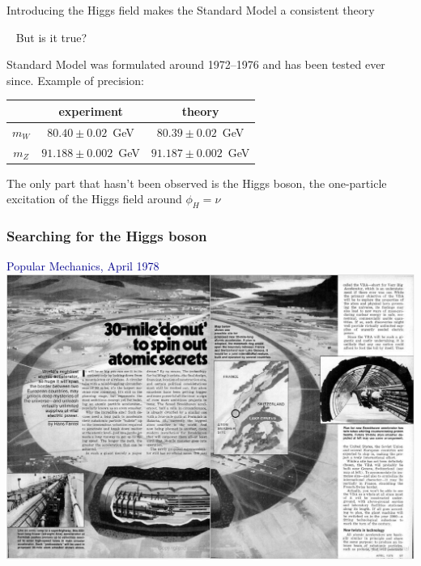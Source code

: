 \documentclass[compress]{beamer}
\begin{document}

\begin{frame}
Introducing the Higgs field makes the Standard Model a consistent theory

\vfill
\mbox{ } \hfill But is it true? \hfill \mbox{ }

\vfill
Standard Model was formulated around 1972--1976 and has been tested ever since.  Example of precision:
\begin{center}
\begin{tabular}{c c c}
& experiment & theory \\\hline
$m_{W}$ & $80.40 \pm 0.02$~GeV & $80.39 \pm 0.02$~GeV \\
$m_{Z}$ & $91.188 \pm 0.002$~GeV & $91.187 \pm 0.002$~GeV \\
\end{tabular}
\end{center}

\vfill
The only part that hasn't been observed is the Higgs boson, the one-particle excitation of the Higgs field around $\phi_H = \nu$
\end{frame}

\begin{frame}
\frametitle{Searching for the Higgs boson}
\textcolor{darkblue}{Popular Mechanics, April 1978}
\includegraphics[width=\linewidth]{popular_mechanics.png}
\end{frame}
\end{document}
